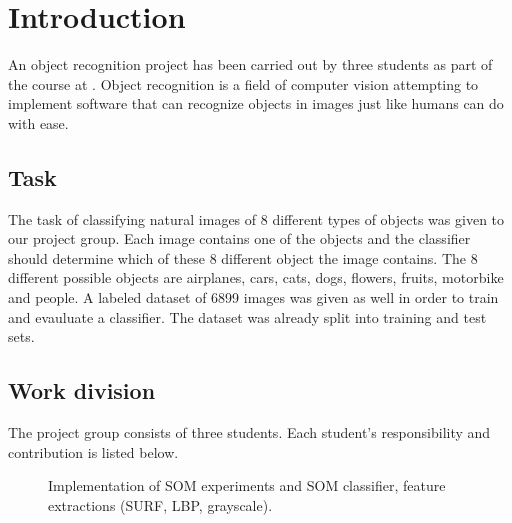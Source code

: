 \documentclass[doc/report.tex]{subfiles}
\begin{document}
\section{Introduction}
An object recognition project has been carried out by three students as part of
the course \courseName{} at \courseUniversity. Object recognition is a field of
computer vision attempting to implement software that can recognize objects in
images just like humans can do with ease.

\subsection{Task}
The task of classifying natural images of 8 different types of objects was
given to our project group. Each image contains one of the objects and the
classifier should determine which of these 8 different object the image
contains. The 8 different possible objects are airplanes, cars, cats, dogs,
flowers, fruits, motorbike and people. A labeled dataset of 6899 images was
given as well in order to train and evauluate a classifier. The dataset was
already split into training and test sets.

\subsection{Work division}
The project group consists of three students. Each student's responsibility and
contribution is listed below.

\begin{description}
    \item[\authorA] Implementation of SOM experiments and SOM classifier,
        feature extractions (SURF, LBP, grayscale).
    \item[\authorB] %
    \item[\authorC] %
\end{description}
    
\end{document}
